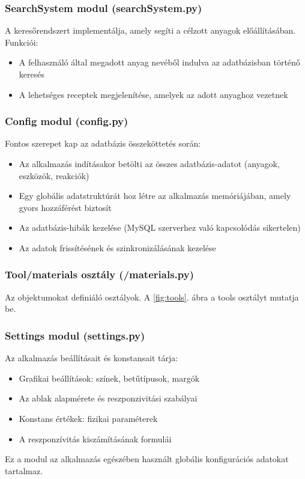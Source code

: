 \documentclass[]{thesis-ekf}
\begin{document}
	
	\subsubsection{SearchSystem modul (searchSystem.py)}
	
	A keresőrendszert implementálja, amely segíti a célzott anyagok előállításában. Funkciói:
	\begin{itemize}
		\item A felhasználó által megadott anyag nevéből indulva az adatbázisban történő keresés
		\item A lehetséges receptek megjelenítése, amelyek az adott anyaghoz vezetnek
	\end{itemize}
	
	\subsubsection{Config modul (config.py)}
	
	Fontos szerepet kap az adatbázis összeköttetés során:
	\begin{itemize}
		\item Az alkalmazás indításakor betölti az összes adatbázis-adatot (anyagok, eszközök, reakciók)
		\item Egy globális adatstruktúrát hoz létre az alkalmazás memóriájában, amely gyors hozzáférést biztosít
		\item Az adatbázis-hibák kezelése (MySQL szerverhez való kapcsolódás sikertelen)
		\item Az adatok frissítésének és szinkronizálásának kezelése
	\end{itemize}
	
	\subsubsection{Tool/materials osztály (/materials.py)}
	
	Az objektumokat definiáló osztályok. A \ref{fig:tools}. ábra a tools osztályt mutatja be.
	
	
	
	\subsubsection{Settings modul (settings.py)}
	
	Az alkalmazás beállításait és konstansait tárja:
	\begin{itemize}
		\item Grafikai beállítások: színek, betűtípusok, margók
		\item Az ablak alapmérete és reszponzivitási szabályai
		\item Konstans értékek: fizikai paraméterek 
		\item A reszponzívitás kiszámításának formulái
	\end{itemize}
	Ez a modul az alkalmazás egészében használt globális konfigurációs adatokat tartalmaz.
	
\end{document}
